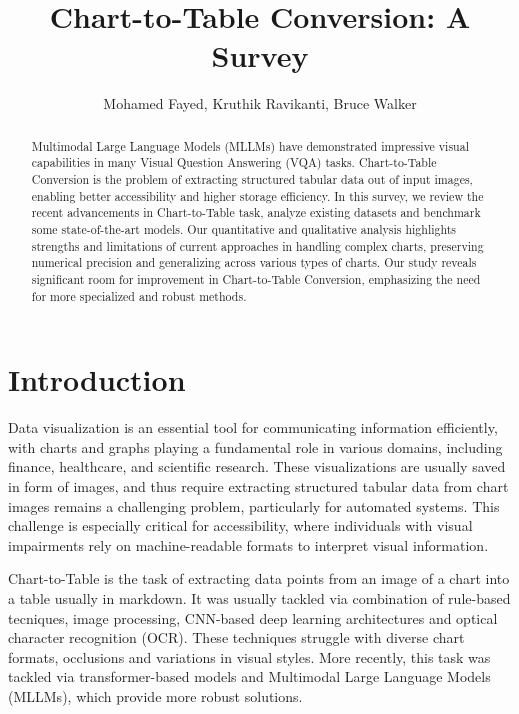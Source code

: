 \documentclass[
	letterpaper, %
]{jdf}
\author{Mohamed Fayed, Kruthik Ravikanti, Bruce Walker}
\title{Chart-to-Table Conversion: A Survey}
\begin{document}

\maketitle

\begin{abstract}
    Multimodal   Large Language Models (MLLMs) have demonstrated impressive visual capabilities in many Visual Question Answering (VQA) tasks.
    Chart-to-Table Conversion is the problem of extracting structured tabular data out of input images, enabling better accessibility and higher storage efficiency.
In this survey, we review the recent advancements in Chart-to-Table task, analyze existing datasets and benchmark some state-of-the-art models.
Our quantitative and qualitative analysis highlights strengths and limitations of current approaches in handling complex charts, preserving numerical precision and generalizing across various types of charts.
Our study reveals significant room for improvement in Chart-to-Table Conversion, emphasizing the need for more specialized and robust methods.
   \end{abstract}


\section{Introduction}\label{sect:intro}
Data visualization is an essential tool for communicating information efficiently, with charts and graphs playing a fundamental role in various domains, including finance, healthcare, and scientific research.
These visualizations are usually saved in form of images, and thus require extracting structured tabular data from chart images remains a challenging problem, particularly for automated systems.
This challenge is especially critical for accessibility, where individuals with visual impairments rely on machine-readable formats to interpret visual information.

Chart-to-Table is the task of extracting data points from an image of a chart into a table usually in markdown\cite{liu2022deplot,masry2024chartgemma}.
It was usually tackled via combination of rule-based tecniques, image processing, CNN-based deep learning architectures and optical character recognition (OCR).
These techniques struggle with diverse chart formats, occlusions and variations in visual styles.
More recently, this task was tackled via transformer-based models and Multimodal Large Language Models (MLLMs), which provide more robust solutions.
\end{document}

